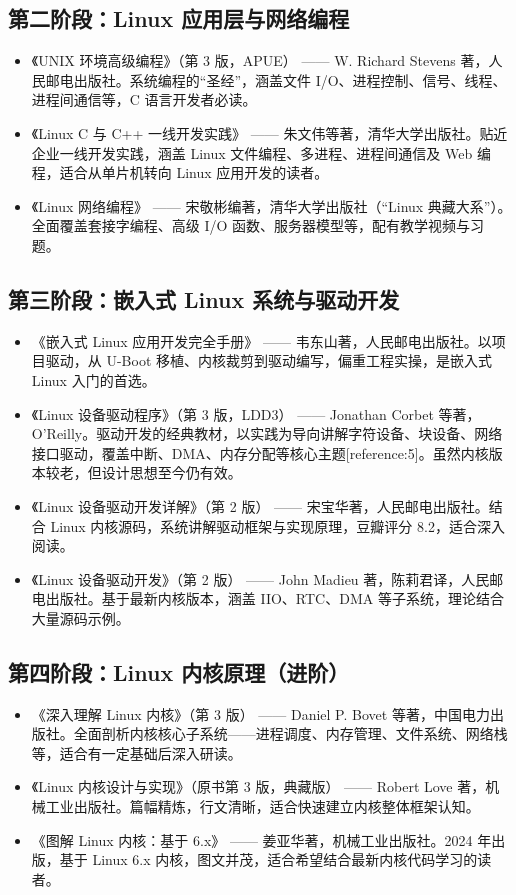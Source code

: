 \subsection*{第二阶段：Linux 应用层与网络编程}
\begin{itemize}
	\item 《UNIX 环境高级编程》（第 3 版，APUE） —— W. Richard Stevens 著，人民邮电出版社。系统编程的“圣经”，涵盖文件 I/O、进程控制、信号、线程、进程间通信等，C 语言开发者必读。
	\item 《Linux C 与 C++ 一线开发实践》 —— 朱文伟等著，清华大学出版社。贴近企业一线开发实践，涵盖 Linux 文件编程、多进程、进程间通信及 Web 编程，适合从单片机转向 Linux 应用开发的读者。
	\item 《Linux 网络编程》 —— 宋敬彬编著，清华大学出版社（“Linux 典藏大系”）。全面覆盖套接字编程、高级 I/O 函数、服务器模型等，配有教学视频与习题。
\end{itemize}

\subsection*{第三阶段：嵌入式 Linux 系统与驱动开发}
\begin{itemize}
	\item 《嵌入式 Linux 应用开发完全手册》 —— 韦东山著，人民邮电出版社。以项目驱动，从 U-Boot 移植、内核裁剪到驱动编写，偏重工程实操，是嵌入式 Linux 入门的首选。
	\item 《Linux 设备驱动程序》（第 3 版，LDD3） —— Jonathan Corbet 等著，O'Reilly。驱动开发的经典教材，以实践为导向讲解字符设备、块设备、网络接口驱动，覆盖中断、DMA、内存分配等核心主题[reference:5]。虽然内核版本较老，但设计思想至今仍有效。
	\item 《Linux 设备驱动开发详解》（第 2 版） —— 宋宝华著，人民邮电出版社。结合 Linux 内核源码，系统讲解驱动框架与实现原理，豆瓣评分 8.2，适合深入阅读。
	\item 《Linux 设备驱动开发》（第 2 版） —— John Madieu 著，陈莉君译，人民邮电出版社。基于最新内核版本，涵盖 IIO、RTC、DMA 等子系统，理论结合大量源码示例。
\end{itemize}

\subsection*{第四阶段：Linux 内核原理（进阶）}
\begin{itemize}
	\item 《深入理解 Linux 内核》（第 3 版） —— Daniel P. Bovet 等著，中国电力出版社。全面剖析内核核心子系统——进程调度、内存管理、文件系统、网络栈等，适合有一定基础后深入研读。
	\item 《Linux 内核设计与实现》（原书第 3 版，典藏版） —— Robert Love 著，机械工业出版社。篇幅精炼，行文清晰，适合快速建立内核整体框架认知。
	\item 《图解 Linux 内核：基于 6.x》 —— 姜亚华著，机械工业出版社。2024 年出版，基于 Linux 6.x 内核，图文并茂，适合希望结合最新内核代码学习的读者。
\end{itemize}

